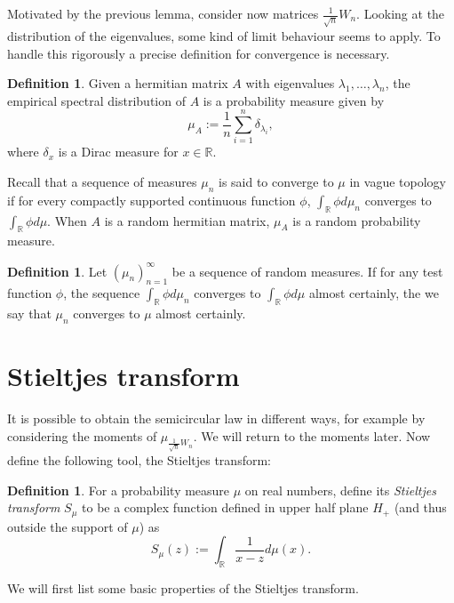 \documentclass[12pt,a4paper,leqno]{report}
\newcommand{\R}{\mathbb{R}}
\theoremstyle{plain}
\theoremstyle{definition}
\newtheorem{defi}[equation]{Definition}
\theoremstyle{remark}
\begin{document}
Motivated by the previous lemma, consider now matrices $\frac{1}{\sqrt{n}}W_n$. Looking at the distribution of the eigenvalues, some kind of limit behaviour seems to apply. To handle this rigorously a precise definition for convergence is necessary.

\begin{defi}
Given a hermitian matrix $A$ with eigenvalues $\lambda_1, \ldots , \lambda_n$, the empirical spectral distribution of $A$ is a probability measure given by
\begin{equation*}
\mu_A := \frac{1}{n} \sum_{i=1}^n \delta_{\lambda_i},
\end{equation*}
where $\delta_x$ is a Dirac measure for $x \in \R$.
\end{defi}

Recall that a sequence of measures $\mu_n$ is said to converge to $\mu$ in vague topology if for every compactly supported continuous function $\phi$, $\int_{\R} \phi d\mu_n$ converges to $\int_{\R}\phi d\mu$. When $A$ is a random hermitian matrix, $\mu_A$ is a random probability measure.

\begin{defi}
Let $(\mu_n)_{n=1}^{\infty}$ be a sequence of random measures.
If for any test function $\phi$, the sequence $\int_{\R} \phi d\mu_n$ converges to $\int_{\R} \phi d\mu$ almost certainly, the we say that $\mu_n$ converges to $\mu$ almost certainly.
\end{defi}

\section{Stieltjes transform}
\label{stieltjes}


It is possible to obtain the semicircular law in different ways, for example by considering the moments of $\mu_{\frac{1}{\sqrt{n}}W_n}$. We will return to the moments later. Now define the following tool, the Stieltjes transform:

\begin{defi}
For a probability measure $\mu$ on real numbers, define its \emph{Stieltjes transform} $S_{\mu}$ to be a complex function defined in upper half plane $H_+$ (and thus outside the support of $\mu$) as
\begin{equation*}
S_{\mu} (z) := \int_{\R} \frac{1}{x-z} d \mu(x).
\end{equation*}
\end{defi}

We will first list some basic properties of the Stieltjes transform.
\end{document}
